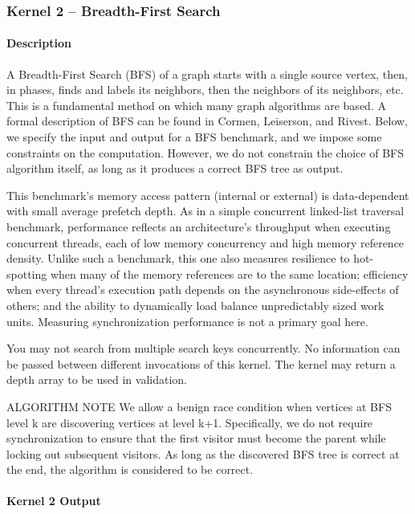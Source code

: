 \documentclass{article}
\begin{document}
\subsubsection*{Kernel 2 -- Breadth-First Search}

\paragraph*{Description}

A Breadth-First Search (BFS) of a graph starts with a single source vertex, then, in phases, finds and labels its neighbors, then the neighbors of its neighbors, etc. This is a fundamental method on which many graph algorithms are based. A formal description of BFS can be found in Cormen, Leiserson, and Rivest. Below, we specify the input and output for a BFS benchmark, and we impose some constraints on the computation. However, we do not constrain the choice of BFS algorithm itself, as long as it produces a correct BFS tree as output.

This benchmark's memory access pattern (internal or external) is data-dependent with small average prefetch depth. As in a simple concurrent linked-list traversal benchmark, performance reflects an architecture's throughput when executing concurrent threads, each of low memory concurrency and high memory reference density. Unlike such a benchmark, this one also measures resilience to hot-spotting when many of the memory references are to the same location; efficiency when every thread's execution path depends on the asynchronous side-effects of others; and the ability to dynamically load balance unpredictably sized work units. Measuring synchronization performance is not a primary goal here.

You may not search from multiple search keys concurrently. No information can be passed between different invocations of this kernel. The kernel may return a depth array to be used in validation.

ALGORITHM NOTE We allow a benign race condition when vertices at BFS level k are discovering vertices at level k+1. Specifically, we do not require synchronization to ensure that the first visitor must become the parent while locking out subsequent visitors. As long as the discovered BFS tree is correct at the end, the algorithm is considered to be correct.

\paragraph*{Kernel 2 Output}
\end{document}
